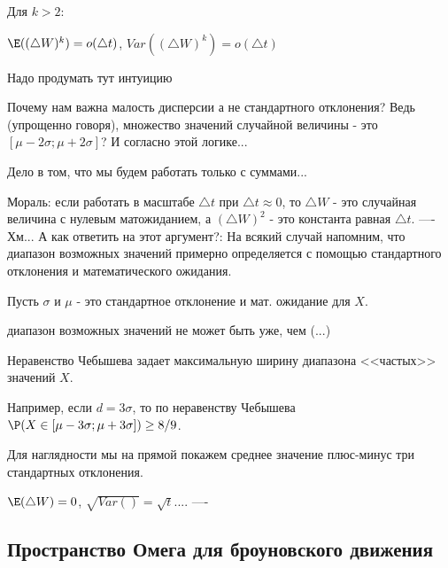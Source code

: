 {Для $k>2$:

$\E((\triangle W)^{k})=o(\triangle t)$, $Var((\triangle W)^{k})=o(\triangle t)$

Надо продумать тут интуицию


Почему нам важна малость дисперсии а не стандартного отклонения? Ведь (упрощенно говоря), множество значений случайной величины - это $[\mu-2\sigma;\mu+2\sigma]$? И согласно этой логике...

Дело в том, что мы будем работать только с суммами... 


Мораль: если работать в масштабе $\triangle t$ при $\triangle t \approx 0$, то $\triangle W$ - это случайная величина с нулевым матожиданием, а $(\triangle W)^{2}$ - это константа равная $\triangle t$.
----
Хм... А как ответить на этот аргумент?: 
На всякий случай напомним, что диапазон возможных значений примерно определяется с помощью стандартного отклонения и математического ожидания.

Пусть $\sigma$ и $\mu$ - это стандартное отклонение и мат. ожидание для $X$.

диапазон возможных значений не может быть уже, чем (...) 

Неравенство Чебышева задает максимальную ширину диапазона <<частых>> значений $X$.

Например, если $d=3\sigma$, то по неравенству Чебышева $\P(X\in[\mu-3\sigma;\mu+3\sigma])\geq 8/9$.

Для наглядности мы на прямой покажем среднее значение плюс-минус три стандартных отклонения.

$\E(\triangle W)=0$, $\sqrt{Var()}=\sqrt{t}$....
----




}\subsection{Пространство Омега для броуновского движения}  
